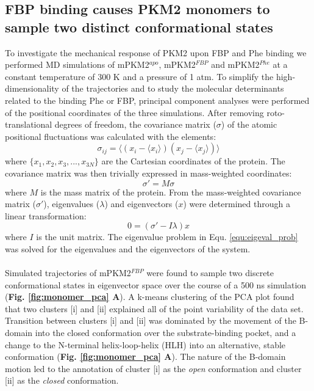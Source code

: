 \subsection{FBP binding causes PKM2 monomers to sample two distinct conformational states}
To investigate the mechanical response of PKM2 upon FBP and Phe binding we performed MD simulations of mPKM2$^{apo}$, mPKM2$^{FBP}$ and mPKM2$^{Phe}$ at a constant temperature of 300 K and a pressure of 1 atm. To simplify the high-dimensionality of the trajectories and to study the molecular determinants related to the binding Phe or FBP, principal component analyses were performed of the positional coordinates of the three simulations. After removing roto-translational degrees of freedom, the covariance matrix ($\sigma$) of the atomic positional fluctuations was calculated with the elements:
%
%
\begin{equation}
\sigma_{ij} = \langle (x_{i} - \langle x_i \rangle )( x_j - \langle x_j \rangle ) \rangle
\label{equ:covmat}
\end{equation}
%
%
where $\lbrace x_{1}, x_{2}, x_{3}, ..., x_{3N} \rbrace$ are the Cartesian coordinates of the protein. The covariance matrix was then trivially expressed in mass-weighted coordinates:
%
%
\begin{equation}
\sigma ' = M \sigma
\end{equation}
%
%
where $M$ is the mass matrix of the protein. From the mass-weighted covariance matrix ($\sigma '$), eigenvalues ($\lambda$) and eigenvectors ($x$) were determined through a linear transformation:
%
%
\begin{equation}
0 = (\sigma ' - I \lambda ) x
\label{equ:eigeval_prob}
\end{equation}
%
%
where $I$ is the unit matrix. The eigenvalue problem in Equ. \ref{equ:eigeval_prob} was solved for the eigenvalues and the eigenvectors of the system. 
%
%
\\\\
%
%
Simulated trajectories of mPKM2$^{FBP}$ were found to sample two discrete conformational states in eigenvector space over the course of a 500 ns simulation (\textbf{Fig. \ref{fig:monomer_pca} A}). A k-means clustering of the PCA plot found that two clusters [i] and [ii] explained all of the point variability of the data set. Transition between clusters [i] and [ii] was dominated by the movement of the B-domain into the closed conformation over the substrate-binding pocket, and a change to the N-terminal helix-loop-helix (HLH) into an alternative, stable conformation (\textbf{Fig. \ref{fig:monomer_pca} A}). The nature of the B-domain motion led to the annotation of cluster [i] as the \textit{open} conformation and cluster [ii] as the \textit{closed} conformation. 
